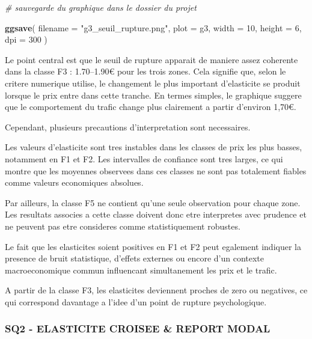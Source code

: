 \documentclass[
]{article}
\newenvironment{Shaded}{\begin{snugshade}}{\end{snugshade}}
\newcommand{\AttributeTok}[1]{\textcolor[rgb]{0.13,0.29,0.53}{#1}}
\newcommand{\CommentTok}[1]{\textcolor[rgb]{0.56,0.35,0.01}{\textit{#1}}}
\newcommand{\DecValTok}[1]{\textcolor[rgb]{0.00,0.00,0.81}{#1}}
\newcommand{\FunctionTok}[1]{\textcolor[rgb]{0.13,0.29,0.53}{\textbf{#1}}}
\newcommand{\NormalTok}[1]{#1}
\newcommand{\StringTok}[1]{\textcolor[rgb]{0.31,0.60,0.02}{#1}}
\begin{document}
\begin{Shaded}
\begin{Highlighting}[]
\CommentTok{\# sauvegarde du graphique dans le dossier du projet}

\FunctionTok{ggsave}\NormalTok{(}
  \AttributeTok{filename =} \StringTok{"g3\_seuil\_rupture.png"}\NormalTok{,}
  \AttributeTok{plot =}\NormalTok{ g3,}
  \AttributeTok{width =} \DecValTok{10}\NormalTok{,}
  \AttributeTok{height =} \DecValTok{6}\NormalTok{,}
  \AttributeTok{dpi =} \DecValTok{300}
\NormalTok{)}
\end{Highlighting}
\end{Shaded}

Le point central est que le seuil de rupture apparait de maniere assez
coherente dans la classe F3 : 1.70--1.90€ pour les trois zones. Cela
signifie que, selon le critere numerique utilise, le changement le plus
important d'elasticite se produit lorsque le prix entre dans cette
tranche. En termes simples, le graphique suggere que le comportement du
trafic change plus clairement a partir d'environ 1,70€.

Cependant, plusieurs precautions d'interpretation sont necessaires.

Les valeurs d'elasticite sont tres instables dans les classes de prix
les plus basses, notamment en F1 et F2. Les intervalles de confiance
sont tres larges, ce qui montre que les moyennes observees dans ces
classes ne sont pas totalement fiables comme valeurs economiques
absolues.

Par ailleurs, la classe F5 ne contient qu'une seule observation pour
chaque zone. Les resultats associes a cette classe doivent donc etre
interpretes avec prudence et ne peuvent pas etre consideres comme
statistiquement robustes.

Le fait que les elasticites soient positives en F1 et F2 peut egalement
indiquer la presence de bruit statistique, d'effets externes ou encore
d'un contexte macroeconomique commun influencant simultanement les prix
et le trafic.

A partir de la classe F3, les elasticites deviennent proches de zero ou
negatives, ce qui correspond davantage a l'idee d'un point de rupture
psychologique.

\subsubsection{SQ2 - ELASTICITE CROISEE \& REPORT
MODAL}\label{sq2---elasticite-croisee-report-modal}
\end{document}
